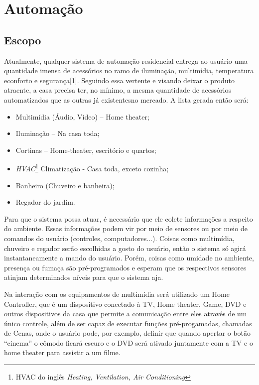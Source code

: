 \chapter{Automação}
\section{Escopo}

	Atualmente, qualquer sistema de automação residencial entrega ao usuário uma quantidade imensa de acessórios no ramo de iluminação, multimídia, temperatura econforto e segurança[1]. Seguindo essa vertente e visando deixar o produto atraente, a casa precisa ter, no mínimo, a mesma quantidade de acessórios automatizados que as outras já existentesno mercado. A lista gerada então será:

\begin{itemize}
	\item Multimídia (Áudio, Vídeo) – Home theater;
	\item Iluminação – Na casa toda;
	\item Cortinas – Home-theater, escritório e quartos;
	\item \textit{HVAC}\footnote{HVAC do inglês \textit{Heating, Ventilation, Air Conditioning}} Climatização - Casa toda, exceto cozinha;
	\item Banheiro (Chuveiro e banheira);
	\item Regador do jardim.
\end{itemize}

	Para que o sistema possa atuar, é necessário que ele colete informações a respeito do ambiente. Essas informações podem vir por meio de sensores ou por meio de comandos do usuário (controles, computadores...). Coisas como multimídia, chuveiro e regador serão escolhidas a gosto do usuário, então o sistema só agirá instantaneamente a mando do usuário. Porém, coisas como umidade no ambiente, presença ou fumaça são pré-programados e esperam que os respectivos sensores atinjam determinados níveis para que o sistema aja.

	Na interação com os equipamentos de multimídia será utilizado um Home Controller, que é um dispositivo conectado à TV, Home theater, Game, DVD e outros dispositivos da casa que permite a comunicação entre eles através de um único controle, além de ser capaz de executar funções pré-progamadas, chamadas de Cenas, onde o usuário pode, por exemplo, definir que quando apertar o botão “cinema” o cômodo ficará escuro e o DVD será ativado juntamente com a TV e o home theater para assistir a um filme.

